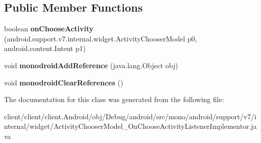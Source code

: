 \subsection*{Public Member Functions}
\begin{DoxyCompactItemize}
\item 
\hypertarget{classmono_1_1android_1_1support_1_1v7_1_1internal_1_1widget_1_1ActivityChooserModel__OnChooseActivityListenerImplementor_af037d6e67358107ed18d2d3852a04b5d}{}boolean {\bfseries on\+Choose\+Activity} (android.\+support.\+v7.\+internal.\+widget.\+Activity\+Chooser\+Model p0, android.\+content.\+Intent p1)\label{classmono_1_1android_1_1support_1_1v7_1_1internal_1_1widget_1_1ActivityChooserModel__OnChooseActivityListenerImplementor_af037d6e67358107ed18d2d3852a04b5d}

\item 
\hypertarget{classmono_1_1android_1_1support_1_1v7_1_1internal_1_1widget_1_1ActivityChooserModel__OnChooseActivityListenerImplementor_a2e6db2728c0cfe7e2c3551a9affcf96f}{}void {\bfseries monodroid\+Add\+Reference} (java.\+lang.\+Object obj)\label{classmono_1_1android_1_1support_1_1v7_1_1internal_1_1widget_1_1ActivityChooserModel__OnChooseActivityListenerImplementor_a2e6db2728c0cfe7e2c3551a9affcf96f}

\item 
\hypertarget{classmono_1_1android_1_1support_1_1v7_1_1internal_1_1widget_1_1ActivityChooserModel__OnChooseActivityListenerImplementor_a21102eb78d7067400ed992eff93220aa}{}void {\bfseries monodroid\+Clear\+References} ()\label{classmono_1_1android_1_1support_1_1v7_1_1internal_1_1widget_1_1ActivityChooserModel__OnChooseActivityListenerImplementor_a21102eb78d7067400ed992eff93220aa}

\end{DoxyCompactItemize}


The documentation for this class was generated from the following file\+:\begin{DoxyCompactItemize}
\item 
client/client/client.\+Android/obj/\+Debug/android/src/mono/android/support/v7/internal/widget/Activity\+Chooser\+Model\+\_\+\+On\+Choose\+Activity\+Listener\+Implementor.\+java\end{DoxyCompactItemize}
